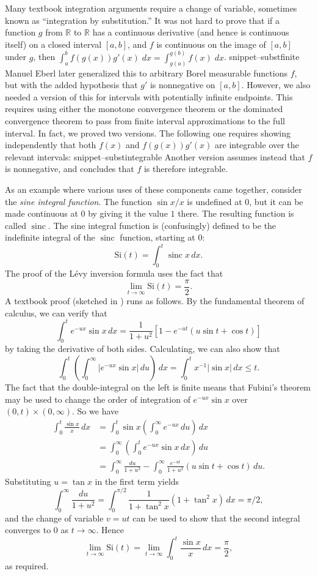 \documentclass{svjour3}
\newcommand{\RR}{\mathbb{R}}
\newcommand{\fn}[1]{\mathrm{#1}} %
\newcommand{\sinc}{\mathop{\fn{sinc}}\nolimits}
\newcommand{\Snippet}[1]{\csname snippet--#1\endcsname}
\begin{document}
Many textbook integration arguments require a change of variable, sometimes known as ``integration by substitution.'' It was not hard to prove that if a function $g$ from $\RR$ to $\RR$ has a continuous derivative (and hence is continuous itself) on a closed interval $[a,b]$, and $f$ is continuous on the image of $[a, b]$ under $g$, then $\int_a^b f(g(x)) g'(x) \; dx = \int_{g(a)}^{g(b)} f(x) \; dx$.
\Snippet{substfinite}
Manuel Eberl later generalized this to arbitrary Borel measurable functions $f$, but with the added hypothesis that $g'$ is nonnegative on $[a, b]$. However, we also needed a version of this for intervals with potentially infinite endpoints. This requires using either the monotone convergence theorem or the dominated convergence theorem to pass from finite interval approximations to the full interval. In fact, we proved two versions. The following one requires showing independently that both $f(x)$ and $f(g(x)) g'(x)$ are integrable over the relevant intervals:
\Snippet{substintegrable}
Another version assumes instead that $f$ is nonnegative, and concludes that $f$ is therefore integrable.

As an example where various uses of these components came together, consider the \emph{sine integral function}. The function $\sin x / x$ is undefined at $0$, but it can be made continuous at $0$ by giving it the value $1$ there. The resulting function is called $\sinc$. The sine integral function is (confusingly) defined to be the indefinite integral of the $\sinc$ function, starting at $0$:
\[
\fn{Si}(t) = \int_0^t \sinc x \, dx.
\]
The proof of the L\'evy inversion formula uses the fact that
\[
\lim_{t \rightarrow \infty} \fn{Si}(t) = \frac{\pi}{2}.
\]
A textbook proof (sketched in \cite[Example 18.4]{billingsley:95}) runs as follows. By the fundamental theorem of calculus, we can verify that
\[
\int_0^t e^{-ux} \sin x \, dx = \frac{1}{1+u^2}[1 - e^{-ut}(u \sin t + \cos t)]
\]
by taking the derivative of both sides. Calculating, we can also show that
\[
\int_0^t \left( \int_0^\infty |e^{-ux} \sin x| \, du\right) \, dx = \int_0^t x^{-1} |\sin x| \, dx \le t.
\]
The fact that the double-integral on the left is finite means that Fubini's theorem may be used to change the order of integration of $e^{-ux} \sin x$ over $(0,t) \times (0, \infty)$. So we have
\begin{align*}
\int_0^t \frac{\sin x}{x} \, dx &= \int_0^t \sin x \left(\int_0^\infty e^{-ux} \, du\right) \, dx \\
                                &= \int_0^\infty \left(\int_0^t e^{-ux} \sin x \, dx\right) \, du \\
                                &= \int_0^\infty \frac{du}{1+u^2} - \int_0^\infty \frac{e^{-ut}}{1+u^2} (u \sin t + \cos t) \, du.
\end{align*}
Substituting $u = \tan x$ in the first term yields
\[
 \int_0^\infty \frac{du}{1+u^2} = \int_0^{\pi/2} \frac{1}{1 + \tan^2 x} (1 + \tan^2 x) \, dx = \pi/2,
\]
and the change of variable $v = ut$ can be used to show that the second integral converges to $0$ as $t \rightarrow \infty$. Hence
\[
\lim_{t \rightarrow \infty} \fn{Si}(t) = \lim_{t \rightarrow \infty} \int_0^t \frac{\sin x}{x} \, dx = \frac{\pi}{2},
\]
as required.
\end{document}
